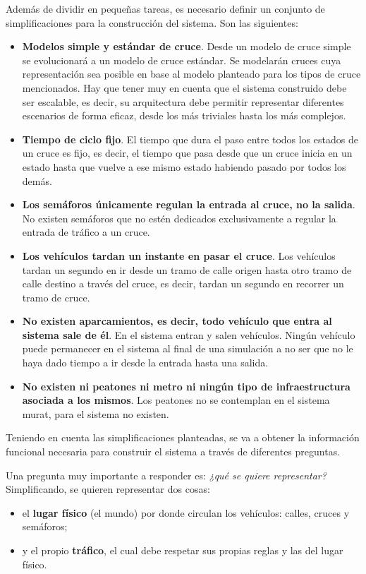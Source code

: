 Además de dividir en pequeñas tareas, es necesario definir un conjunto de simplificaciones para la construcción del sistema. Son las siguientes:
\begin{itemize}
    \item \textbf{Modelos simple y estándar de cruce}. Desde un modelo de cruce simple se evolucionará a un modelo de cruce estándar. Se modelarán cruces cuya representación sea posible en base al modelo planteado para los tipos de cruce mencionados. Hay que tener muy en cuenta que el sistema construido debe ser escalable, es decir, su arquitectura debe permitir representar diferentes escenarios de forma eficaz, desde los más triviales hasta los más complejos.
    \item \textbf{Tiempo de ciclo fijo}. El tiempo que dura el paso entre todos los estados de un cruce es fijo, es decir, el tiempo que pasa desde que un cruce inicia en un estado hasta que vuelve a ese mismo estado habiendo pasado por todos los demás.
    \item \textbf{Los semáforos únicamente regulan la entrada al cruce, no la salida}. No existen semáforos que no estén dedicados exclusivamente a regular la entrada de tráfico a un cruce.
    \item \textbf{Los vehículos tardan un instante en pasar el cruce}. Los vehículos tardan un segundo en ir desde un tramo de calle origen hasta otro tramo de calle destino a través del cruce, es decir, tardan un segundo en recorrer un tramo de cruce.
    \item \textbf{No existen aparcamientos, es decir, todo vehículo que entra al sistema sale de él}. En el sistema entran y salen vehículos. Ningún vehículo puede permanecer en el sistema al final de una simulación a no ser que no le haya dado tiempo a ir desde la entrada hasta una salida.
    \item \textbf{No existen ni peatones ni metro ni ningún tipo de infraestructura asociada a los mismos}. Los peatones no se contemplan en el sistema \acrshort{murat}, para el sistema no existen.
\end{itemize}

Teniendo en cuenta las simplificaciones planteadas, se va a obtener la información funcional necesaria para construir el sistema a través de diferentes preguntas.

Una pregunta muy importante a responder es: \textit{¿qué se quiere representar?} Simplificando, se quieren representar dos cosas:
\begin{itemize}
    \item el \textbf{lugar físico} (el mundo) por donde circulan los vehículos: calles, cruces y semáforos;
    \item y el propio \textbf{tráfico}, el cual debe respetar sus propias reglas y las del lugar físico.
\end{itemize}


